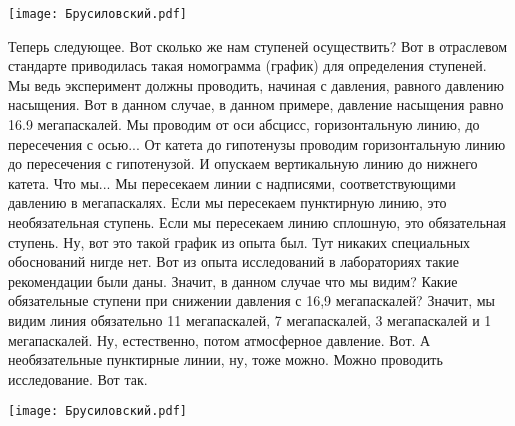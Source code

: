 \documentclass[main.tex]{subfiles}
\begin{document}
\begin{center}
\texttt{[image: Брусиловский.pdf]}
\end{center}

Теперь следующее.
Вот сколько же нам ступеней осуществить?
Вот в отраслевом стандарте приводилась такая номограмма (график) для определения ступеней.
Мы ведь эксперимент должны проводить, начиная с давления, равного давлению насыщения.
Вот в данном случае, в данном примере, давление насыщения равно 16.9 мегапаскалей.
Мы проводим от оси абсцисс, горизонтальную линию, до пересечения с осью...
От катета до гипотенузы проводим горизонтальную линию до пересечения с гипотенузой.
И опускаем вертикальную линию до нижнего катета.
Что мы...
Мы пересекаем линии с надписями, соответствующими давлению в мегапаскалях.
Если мы пересекаем пунктирную линию, это необязательная ступень.
Если мы пересекаем линию сплошную, это обязательная ступень.
Ну, вот это такой график из опыта был.
Тут никаких специальных обоснований нигде нет.
Вот из опыта исследований в лабораториях такие рекомендации были даны.
Значит, в данном случае что мы видим?
Какие обязательные ступени при снижении давления с 16,9 мегапаскалей?
Значит, мы видим линия обязательно 11 мегапаскалей, 7 мегапаскалей, 3 мегапаскалей и 1 мегапаскалей.
Ну, естественно, потом атмосферное давление.
Вот.
А необязательные пунктирные линии, ну, тоже можно.
Можно проводить исследование.
Вот так.

\begin{center}
\texttt{[image: Брусиловский.pdf]}
\end{center}
\end{document}
